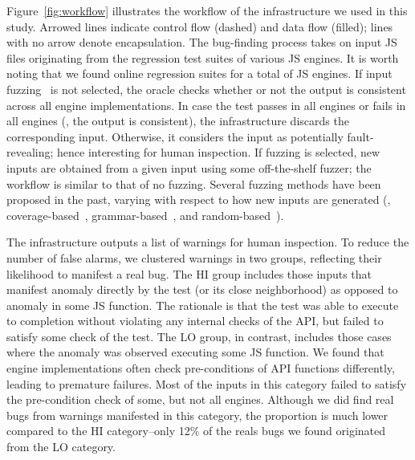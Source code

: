 \documentclass[10pt,conference,anonymous]{IEEEtran}
\begin{document}
Figure~\ref{fig:workflow} illustrates the workflow of the
infrastructure we used in this study. Arrowed lines indicate control
flow (dashed) and data flow (filled); lines with no arrow denote
encapsulation. The bug-finding process takes on input JS files
originating from the regression test suites of various JS engines. It
is worth noting that we found online regression suites for a total of
 JS engines.
If input fuzzing~\cite{fuzz-testing-history} is not selected, the
oracle checks whether or not the output is consistent across all
engine implementations. In case the test passes in all engines or
fails in all engines (\ie{}, the output is consistent), the
infrastructure discards the corresponding input. Otherwise, it
considers the input as potentially fault-revealing; hence interesting
for human inspection. If fuzzing is selected, new inputs are obtained
from a given input using some off-the-shelf fuzzer; the workflow is
similar to that of no fuzzing. Several fuzzing methods have been
proposed in the past, varying with respect to how new inputs are
generated (\eg{}, coverage-based~\cite{afl,honggfuzz},
grammar-based~\cite{grammarinator,jsfunfuzz}, and
random-based~\cite{radamsa}). 

The infrastructure outputs a list of warnings for human inspection.
To reduce the number of false alarms, we clustered warnings in two
groups, reflecting their likelihood to manifest a real bug. The HI
group includes those inputs that manifest anomaly directly by the test
(or its close neighborhood) as opposed to anomaly in some JS
function. The rationale is that the test was able to execute to
completion without violating any internal checks of the API, but
failed to satisfy some check of the test. The LO group, in contrast,
includes those cases where the anomaly was observed executing some JS
function. We found that engine implementations often check
pre-conditions of API functions differently, leading to premature
failures. Most of the inputs in this category failed to satisfy the
pre-condition check of some, but not all engines. Although we did find
real bugs from warnings manifested in this category, the proportion is
much lower compared to the HI category--only 12\% of the reals bugs we
found originated from the LO category.

\end{document}
